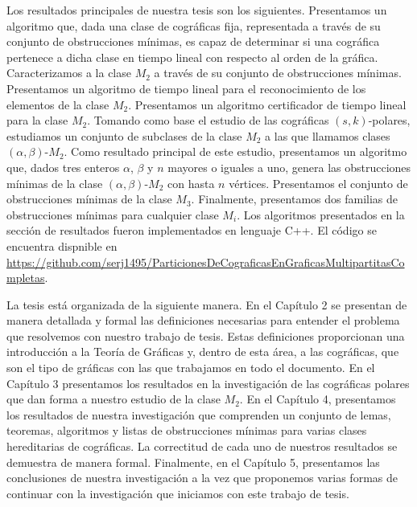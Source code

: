 Los resultados principales de nuestra tesis son los siguientes. Presentamos un algoritmo que, dada una clase de cográficas fija, representada a través de su conjunto de obstrucciones mínimas, es capaz de determinar si una cográfica pertenece a dicha clase en tiempo lineal con respecto al orden de la gráfica. Caracterizamos a la clase $M_2$ a través de su conjunto de obstrucciones mínimas. Presentamos un algoritmo de tiempo lineal para el reconocimiento de los elementos de la clase $M_2$. Presentamos un algoritmo certificador de tiempo lineal para la clase $M_2$. Tomando como base el estudio de las cográficas $(s,k)$-polares, estudiamos un conjunto de subclases de la clase $M_2$ a las que llamamos clases $(\alpha,\beta)$-$M_2$. Como resultado principal de este estudio, presentamos un algoritmo que, dados tres enteros $\alpha$, $\beta$ y $n$ mayores o iguales a uno, genera las obstrucciones mínimas de la clase $(\alpha,\beta)$-$M_2$ con hasta $n$ vértices. Presentamos el conjunto de obstrucciones mínimas de la clase $M_3$. Finalmente, presentamos dos familias de obstrucciones mínimas para cualquier clase $M_i$. Los algoritmos presentados en la sección de resultados fueron implementados en lenguaje C++. El código se encuentra dispnible en \url{https://github.com/serj1495/ParticionesDeCograficasEnGraficasMultipartitasCompletas}.  

La tesis está organizada de la siguiente manera. En el Capítulo 2 se presentan de manera detallada y formal las definiciones necesarias para entender el problema que resolvemos con nuestro trabajo de tesis. Estas definiciones proporcionan una introducción a la Teoría de Gráficas y, dentro de esta área, a las cográficas, que son el tipo de gráficas con las que trabajamos en todo el documento. En el Capítulo 3 presentamos los resultados en la investigación de las cográficas polares que dan forma a nuestro estudio de la clase $M_2$. En el Capítulo 4, presentamos los resultados de nuestra investigación que comprenden un conjunto de lemas, teoremas, algoritmos y listas de obstrucciones mínimas para varias clases hereditarias de cográficas. La correctitud de cada uno de nuestros resultados se demuestra de manera formal. Finalmente, en el Capítulo 5, presentamos las conclusiones de nuestra investigación a la vez que proponemos varias formas de continuar con la investigación que iniciamos con este trabajo de tesis.
